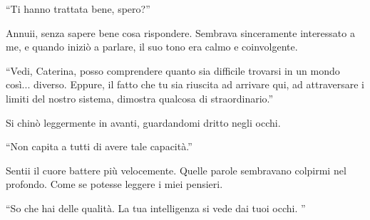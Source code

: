 \begin{dialogue}
 \enquote{Ti hanno trattata bene, spero?}
\end{dialogue}

Annuii, senza sapere bene cosa rispondere. Sembrava sinceramente interessato a me, e quando iniziò a parlare, il suo tono era calmo e coinvolgente.

\begin{dialogue}
 \enquote{Vedi, Caterina, posso comprendere quanto sia difficile trovarsi in un mondo così... diverso. Eppure, il fatto che tu sia riuscita ad arrivare qui, ad attraversare i limiti del nostro sistema, dimostra qualcosa di straordinario.}
\end{dialogue}

Si chinò leggermente in avanti, guardandomi dritto negli occhi.

\begin{dialogue}
 \enquote{Non capita a tutti di avere tale capacità.}
\end{dialogue}

Sentii il cuore battere più velocemente. Quelle parole sembravano colpirmi nel profondo. Come se potesse leggere i miei pensieri.

\begin{dialogue}
   \enquote{So che hai delle qualità. La tua intelligenza si vede dai tuoi occhi.
  }
\end{dialogue}
\newpage
